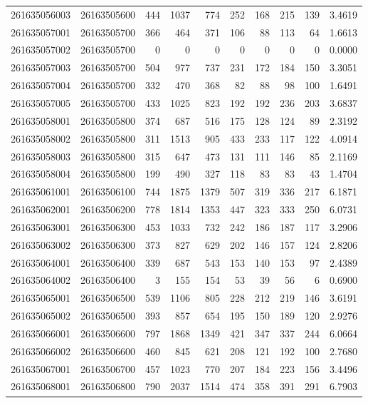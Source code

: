 \documentclass[
  11pt,
]{article}
\begin{document}
\begin{longtable}[t]{llrrrrrrrr}
261635056003 & 26163505600 & 444 & 1037 & 774 & 252 & 168 & 215 & 139 & 3.4619\\
261635057001 & 26163505700 & 366 & 464 & 371 & 106 & 88 & 113 & 64 & 1.6613\\
261635057002 & 26163505700 & 0 & 0 & 0 & 0 & 0 & 0 & 0 & 0.0000\\
261635057003 & 26163505700 & 504 & 977 & 737 & 231 & 172 & 184 & 150 & 3.3051\\
261635057004 & 26163505700 & 332 & 470 & 368 & 82 & 88 & 98 & 100 & 1.6491\\
261635057005 & 26163505700 & 433 & 1025 & 823 & 192 & 192 & 236 & 203 & 3.6837\\
261635058001 & 26163505800 & 374 & 687 & 516 & 175 & 128 & 124 & 89 & 2.3192\\
261635058002 & 26163505800 & 311 & 1513 & 905 & 433 & 233 & 117 & 122 & 4.0914\\
261635058003 & 26163505800 & 315 & 647 & 473 & 131 & 111 & 146 & 85 & 2.1169\\
261635058004 & 26163505800 & 199 & 490 & 327 & 118 & 83 & 83 & 43 & 1.4704\\
261635061001 & 26163506100 & 744 & 1875 & 1379 & 507 & 319 & 336 & 217 & 6.1871\\
261635062001 & 26163506200 & 778 & 1814 & 1353 & 447 & 323 & 333 & 250 & 6.0731\\
261635063001 & 26163506300 & 453 & 1033 & 732 & 242 & 186 & 187 & 117 & 3.2906\\
261635063002 & 26163506300 & 373 & 827 & 629 & 202 & 146 & 157 & 124 & 2.8206\\
261635064001 & 26163506400 & 339 & 687 & 543 & 153 & 140 & 153 & 97 & 2.4389\\
261635064002 & 26163506400 & 3 & 155 & 154 & 53 & 39 & 56 & 6 & 0.6900\\
261635065001 & 26163506500 & 539 & 1106 & 805 & 228 & 212 & 219 & 146 & 3.6191\\
261635065002 & 26163506500 & 393 & 857 & 654 & 195 & 150 & 189 & 120 & 2.9276\\
261635066001 & 26163506600 & 797 & 1868 & 1349 & 421 & 347 & 337 & 244 & 6.0664\\
261635066002 & 26163506600 & 460 & 845 & 621 & 208 & 121 & 192 & 100 & 2.7680\\
261635067001 & 26163506700 & 457 & 1023 & 770 & 207 & 184 & 223 & 156 & 3.4496\\
261635068001 & 26163506800 & 790 & 2037 & 1514 & 474 & 358 & 391 & 291 & 6.7903\\

\end{longtable}
\end{document}
